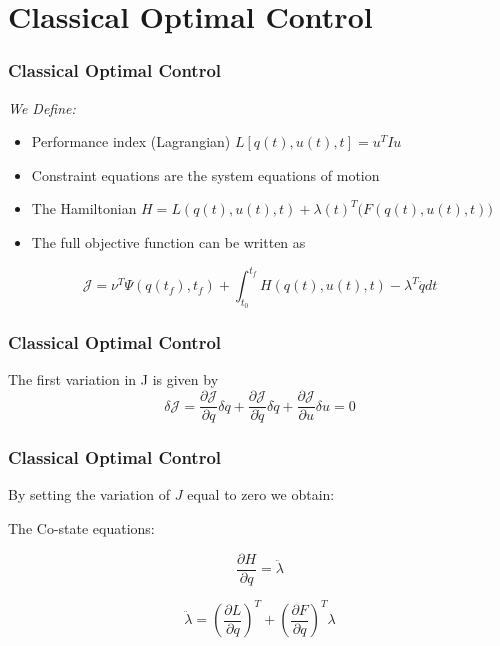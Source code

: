 \documentclass{beamer}
\begin{document}
\section{Classical Optimal Control}


\begin{frame}
\frametitle{Classical Optimal Control}

\textit{We Define:}
\begin{itemize}
	\item Performance index (Lagrangian) $ L[q(t),u(t),t] = u^T I u $
	\item Constraint equations are the system equations of motion
	\item The Hamiltonian $H = L(q(t),u(t),t) + \lambda(t)^T \big( F(q(t),u(t),t) \big)$
      \item  The full objective function can be written as
\end{itemize}

\begin{equation}
    \mathcal{ J } = \nu^T \Psi ( q(t_f),t_f ) + \int_{t_0}^{t_f}  H(q(t),u(t),t) - \lambda^T \ddot q  dt
\end{equation}


\end{frame}



\begin{frame}
\frametitle{Classical Optimal Control}

The first variation in J is given by\\

\begin{equation}
    \delta \mathcal{  J  } = \frac{\partial \mathcal{  J  }}{\partial q} \delta q + \frac{\partial \mathcal{  J  }}{\partial \dot q} \delta \dot q   +  \frac{\partial \mathcal{  J  }}{\partial u} \delta u = 0
\end{equation}


\end{frame}




\begin{frame}
\frametitle{Classical Optimal Control}

By setting the variation of $J$ equal to zero we obtain:

The Co-state equations:

\begin{equation}
\frac{\partial H}{ \partial q } = \ddot \lambda
\end{equation}

\begin{equation}
\ddot \lambda = ( \frac{\partial L}{\partial q}  )^T + ( \frac{\partial F}{\partial q} )^T \lambda
\end{equation}

\end{frame}
\end{document}

